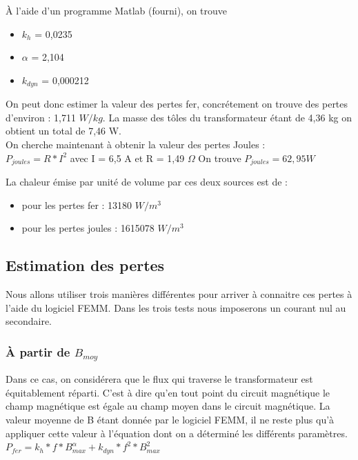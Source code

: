 À l'aide d'un programme Matlab (fourni), on trouve 
\begin{itemize}
\item  $k_h$   = 0,0235
\item $\alpha$ = 2,104
\item $k_{dyn}$ = 0,000212
\end{itemize}

On peut donc estimer la valeur des pertes fer, concrétement on trouve des pertes d'environ : 1,711 $W/kg$. La masse des tôles du transformateur étant de 4,36 kg on obtient un total de 7,46 W. \\

On cherche maintenant à obtenir la valeur des pertes Joules : \\
$P_{joules} = R*I^2$ avec I = 6,5 A et R = 1,49 $\Omega$
On trouve $P_{joules} = 62,95 W$

La chaleur émise par unité de volume par ces deux sources est de : 
\begin{itemize}
\item pour les pertes fer : 13180 $W/m^3$
\item pour les pertes joules : 1615078 $W/m^3$
\end{itemize}
 

\subsection{Estimation des pertes}

Nous allons utiliser trois manières différentes pour arriver à connaitre ces pertes à l'aide du logiciel FEMM. Dans les trois tests nous imposerons un courant nul au secondaire. 

\subsubsection{À partir de $B_{moy}$}

 Dans ce cas, on considérera que le flux qui traverse le transformateur est équitablement réparti. C'est à dire qu'en tout point du circuit magnétique le champ magnétique est égale au champ moyen dans le circuit magnétique. La valeur moyenne de B étant donnée par le logiciel FEMM, il ne reste plus qu'à appliquer cette valeur à l'équation dont on a déterminé les différents paramètres. \\
 $ P_{fer} = k_h*f*B_{max}^{\alpha} + k_{dyn}*f^2*B_{max}^2$\\

